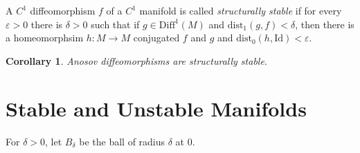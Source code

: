 \documentclass{article}
\newtheorem{cor}{Corollary}
\begin{document}
A $C^1$ diffeomorphism $f$ of a $C^1$ manifold is called \textit{structurally stable} if for every $\varepsilon > 0$ there is $\delta > 0$ such that if $g \in \mathrm{Diff}^1(M)$ and $\mathrm{dist}_1(g,f) < \delta$, then there is a homeomorphsim $h: M \to M$ conjugated $f$ and $g$ and $\mathrm{dist}_0(h, \mathrm{Id}) < \varepsilon$. \\

\begin{cor}
Anosov diffeomorphisms are structurally stable.
\end{cor}

\section{Stable and Unstable Manifolds}

For $\delta > 0$, let $B_{\delta}$ be the ball of radius $\delta$ at $0$.
\end{document}
